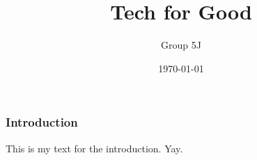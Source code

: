 \documentclass{beamer}
\title{Tech for Good}
\author{Group 5J}
\date{\today}
\begin{document}
\frame{\titlepage}

\begin{frame}

    \frametitle{Introduction}
    This is my text for the introduction. Yay.

\end{frame}
\end{document}
